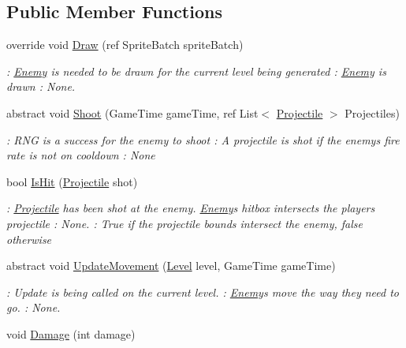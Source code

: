 \subsection*{Public Member Functions}
\begin{DoxyCompactItemize}
\item 
override void \hyperlink{classXaria_1_1Enemy_a0f857a720f4a5ecc037887c846c55afc}{Draw} (ref Sprite\+Batch sprite\+Batch)
\begin{DoxyCompactList}\small\item\em \+: \hyperlink{classXaria_1_1Enemy}{Enemy} is needed to be drawn for the current level being generated \+: \hyperlink{classXaria_1_1Enemy}{Enemy} is drawn \+: None. \end{DoxyCompactList}\item 
abstract void \hyperlink{classXaria_1_1Enemy_a229b595e96e1429a9e9b1d9816d4370b}{Shoot} (Game\+Time game\+Time, ref List$<$ \hyperlink{classXaria_1_1Projectile}{Projectile} $>$ Projectiles)
\begin{DoxyCompactList}\small\item\em \+: R\+NG is a success for the enemy to shoot \+: A projectile is shot if the enemy\textquotesingle{}s fire rate is not on cooldown \+: None \end{DoxyCompactList}\item 
bool \hyperlink{classXaria_1_1Enemy_af2fe968a037dda0f8a17f6d218a55ac6}{Is\+Hit} (\hyperlink{classXaria_1_1Projectile}{Projectile} shot)
\begin{DoxyCompactList}\small\item\em \+: \hyperlink{classXaria_1_1Projectile}{Projectile} has been shot at the enemy. \hyperlink{classXaria_1_1Enemy}{Enemy}\textquotesingle{}s hitbox intersects the player\textquotesingle{}s projectile \+: None. \+: True if the projectile bounds intersect the enemy, false otherwise \end{DoxyCompactList}\item 
abstract void \hyperlink{classXaria_1_1Enemy_abe1058263c5512b5e098e73d3b6d704c}{Update\+Movement} (\hyperlink{classXaria_1_1Level}{Level} level, Game\+Time game\+Time)
\begin{DoxyCompactList}\small\item\em \+: Update is being called on the current level. \+: \hyperlink{classXaria_1_1Enemy}{Enemy}\textquotesingle{}s move the way they need to go. \+: None. \end{DoxyCompactList}\item 
void \hyperlink{classXaria_1_1Enemy_a611772d6cb14268a7593004afef304b3}{Damage} (int damage)

\end{DoxyCompactItemize}

